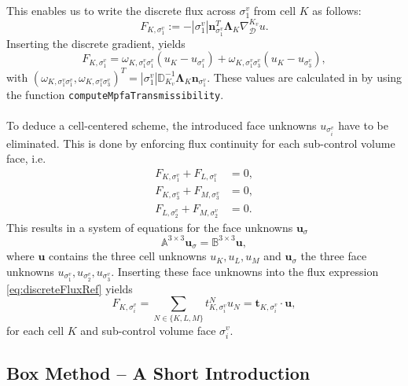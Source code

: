 This enables us to write the discrete flux across $\sigma^v_1$ from cell $K$ as follows:
\begin{equation}
    F_{K, \sigma^v_1} := - |\sigma^v_1| \mathbf{n}_{\sigma^v_1}^T \mathbf{\Lambda}_K \nabla_\mathcal{D}^{K_v} u.
    \label{eq:discreteFlux}
\end{equation}
Inserting the discrete gradient, yields
\begin{equation}
    F_{K, \sigma^v_1} = \omega_{K,\sigma^v_1\sigma^v_1}(u_K - u_{\sigma^v_1}) + \omega_{K,\sigma^v_1 \sigma^v_3}(u_K - u_{\sigma^v_3}),
    \label{eq:discreteFluxRef}
\end{equation}
with $(\omega_{K,\sigma^v_1\sigma^v_1},\omega_{K,\sigma^v_1 \sigma^v_3})^T = |\sigma^v_1| \mathbb{D}^{-1}_{K_v}\mathbf{\Lambda}_K \mathbf{n}_{\sigma^v_1}$. These values are calculated in \Dumux by using the function \texttt{computeMpfaTransmissibility}.
\\ \ \\
To deduce a cell-centered scheme, the introduced face unknowns $u_{\sigma^v_i}$ have to be eliminated. This is done by enforcing flux continuity for each sub-control volume face, i.e.
\begin{align}
F_{K, \sigma^v_1} + F_{L, \sigma^v_1} &= 0, \\ F_{K, \sigma^v_3} + F_{M, \sigma^v_3} &= 0, \\ F_{L, \sigma^v_2} + F_{M, \sigma^v_2} &= 0.
\end{align}
This results in a system of equations for the face unknowns $\mathbf{u}_{\sigma}$
\begin{equation}
\mathbb{A}^{3\times 3} \mathbf{u}_{\sigma} = \mathbb{B}^{3\times 3} \mathbf{u},
\end{equation}
where $\mathbf{u}$ contains the three cell unknowns $u_K,u_L,u_M$ and $\mathbf{u}_{\sigma}$ the three face unknowns $u_{\sigma^v_1}, u_{\sigma^v_2}, u_{\sigma^v_3}$.
Inserting these face unknowns into the flux expression \eqref{eq:discreteFluxRef} yields
\begin{equation}
    F_{K,\sigma^v_i} = \sum_{N \in \lbrace K,L,M \rbrace } t^N_{K,\sigma^v_i} u_{N} = \mathbf{t}_{K,\sigma^v_i} \cdot \mathbf{u},
    \label{eq:FVFluxExpressionSubFace}
\end{equation}
for each cell $K$ and sub-control volume face $\sigma^v_i$.
%
%
\subsection{Box Method -- A Short Introduction}\label{box}

